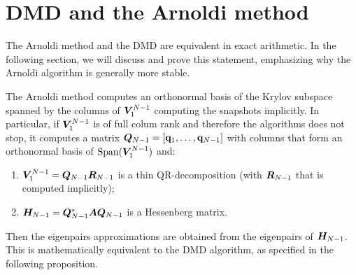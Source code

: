 \section{DMD and the Arnoldi method}
\label{section_dmd_arnoldi}
The Arnoldi method and the DMD are equivalent in exact arithmetic. In the following section, we will discuss and prove this statement, emphasizing why the Arnoldi algorithm is generally more stable.

The Arnoldi method computes an orthonormal basis of the Krylov subspace spanned by the columns of $\vb*{V}_1^{N-1}$ computing the snapshots implicitly. In particular, if $\vb*{V}_1^{N-1}$ is of full colum rank and therefore the algorithms does not stop, it computes a matrix $\vb*{Q}_{N-1} = \left[\vb{q}_1,\dots, \vb{q}_{N-1}\right]$ with columns that form an orthonormal basis of $\mathrm{Span}{(\vb*{V}_1^{N-1})}$ and: 
\begin{enumerate}[label=(\roman*)]
    \item $\vb*{V}_1^{N-1} = \vb*{Q}_{N-1} \vb*{R}_{N-1}$ is a thin QR-decomposition (with $\vb*{R}_{N-1}$ that is computed implicitly);
    \item $\vb*{H}_{N-1} = \vb*{Q}_{N-1}^* \vb*{A} \vb*{Q}_{N-1}$ is a Hessenberg matrix.
\end{enumerate}
Then the eigenpairs approximations are obtained from the eigenpairs of $\vb*{H}_{N-1}$. This is mathematically equivalent to the DMD algorithm, as specified in the following proposition. 

